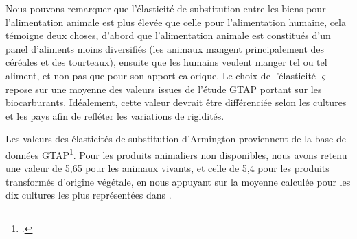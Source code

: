 Nous pouvons remarquer que l'élasticité de substitution entre les biens pour l'alimentation animale est plus élevée que celle pour l'alimentation humaine, cela témoigne deux choses, d'abord que l'alimentation animale est constitués d'un panel d'aliments moins diversifiés (les animaux mangent principalement des céréales et des tourteaux), ensuite que les humains veulent manger tel ou tel aliment, et non pas que pour son apport calorique.
Le choix de l'élasticité $\varsigma$ repose sur une moyenne des valeurs issues de l'étude GTAP \cite{Miller2009} portant sur les biocarburants. Idéalement, cette valeur devrait être différenciée selon les cultures et les pays afin de refléter les variations de rigidités.

Les valeurs des élasticités de substitution d'Armington proviennent de la base de données GTAP\footcite{Aguiar2022}. Pour les produits animaliers non disponibles, nous avons retenu une valeur de 5,65 pour les animaux vivants, et celle de 5,4 pour les produits transformés d'origine végétale, en nous appuyant sur la moyenne calculée pour les dix cultures les plus représentées dans \cite{Costinot2016}.
